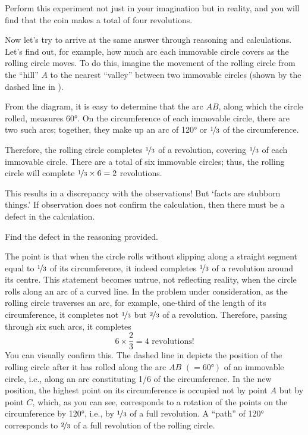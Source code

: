 Perform this experiment not just in your imagination but in reality, and you will find that the coin makes a total of four revolutions.

Now let's try to arrive at the same answer through reasoning and calculations. Let's find out, for example, how much arc each immovable circle covers as the rolling circle moves. To do this, imagine the movement of the rolling circle from the ``hill'' $A$ to the nearest ``valley'' between two immovable circles (shown by the dashed line in ).

From the diagram, it is easy to determine that the arc $AB$, along which the circle rolled, measures \ang{60}. On the circumference of each immovable circle, there are two such arcs; together, they make up an arc of \ang{120} or $\nicefrac{1}{3}$ of the circumference.

Therefore, the rolling circle completes $\nicefrac{1}{3}$ of a revolution, covering $\nicefrac{1}{3}$ of each immovable circle. There are a total of six immovable circles; thus, the rolling circle will complete $\nicefrac{1}{3} \times 6 = 2$ revolutions.

This results in a discrepancy with the observations! But `facts are stubborn things.' If observation does not confirm the calculation, then there must be a defect in the calculation.

Find the defect in the reasoning provided.

\ans  The point is that when the circle rolls without slipping along a straight segment equal to $\nicefrac{1}{3}$ of its circumference, it indeed completes $\nicefrac{1}{3}$ of a revolution around its centre. This statement becomes untrue, not reflecting reality, when the circle rolls along an arc of a curved line. In the problem under consideration, as the rolling circle traverses an arc, for example, one-third of the length of its circumference, it completes not $\nicefrac{1}{3}$ but $\nicefrac{2}{3}$ of a revolution. Therefore, passing through six such arcs, it completes
\begin{equation*}
6 \times \frac{2}{3} = 4\,\,\text{revolutions!}
\end{equation*}
You can visually confirm this. The dashed line in  depicts the position of the rolling circle after it has rolled along the arc $AB\,\, (=\ang{60})$ of an immovable circle, i.e., along an arc constituting 1/6 of the circumference. In the new position, the highest point on its circumference is occupied not by point $A$ but by point $C$, which, as you can see, corresponds to a rotation of the points on the circumference by \ang{120}, i.e., by $\nicefrac{1}{3}$ of a full revolution. A ``path'' of \ang{120} corresponds to $\nicefrac{2}{3}$ of a full revolution of the rolling circle.

